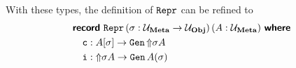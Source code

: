 With these types, the definition of $\Repr$ can be refined to
\begin{align*}
   & \recordwhere[\,(\sigma : \Um \to \Uo)\,(A: \Um)]{Repr}           \\
   & \quad    \defin{c} : A[\sigma] \to \Gen \, \lift{\sigma A} \quad \\
   & \quad    \defin{i} : \lift{\sigma A} \to \Gen \, A(\sigma)
\end{align*}
